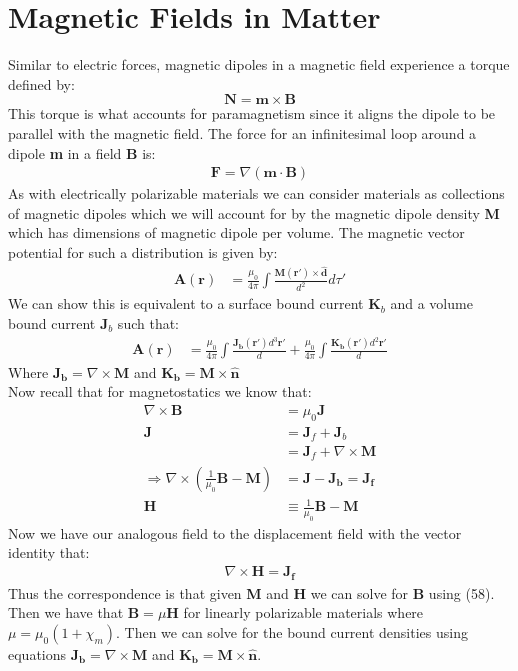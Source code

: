 \documentclass[a4paper, 11pt]{article}
\begin{document}
	\section*{Magnetic Fields in Matter} 
		Similar to electric forces, magnetic dipoles in a magnetic field experience a torque defined by: 
			\begin{equation}
				\mathbf{N} = \mathbf{m} \times \mathbf{B} 
			\end{equation}
		This torque is what accounts for paramagnetism since it aligns the dipole to be parallel with the magnetic field. The force for an infinitesimal loop around a dipole \textbf{m} in a field \textbf{B} is: 
			\begin{align}
				\mathbf{F} = \nabla (\mathbf{m} \cdot \mathbf{B}) 
			\end{align}
		As with electrically polarizable materials we can consider materials as collections of magnetic dipoles which we will account for by the magnetic dipole density \textbf{M} which has dimensions of magnetic dipole per volume. The magnetic vector potential for such a distribution is given by: 
			\begin{align}
				\mathbf{A(r)} &= \frac{\mu_0}{4\pi}\int \frac{\mathbf{M(r')}\times \hat{\mathbf{d}}}{d^2} d\tau' 
			\end{align}
		We can show this is equivalent to a surface bound current $\mathbf{K}_b$ and a volume bound current $\mathbf{J}_b$ such that: 
			\begin{align}
				\mathbf{A(r)} &= \frac{\mu_0}{4\pi}\int \frac{\mathbf{J_b(r')}d^3\mathbf{r'}}{d} + \frac{\mu_0}{4\pi}\int \frac{\mathbf{K_b(r')}d^2\mathbf{r'}}{d}
			\end{align}
		Where $\mathbf{J_b} = \nabla \times \mathbf{M}$ and $\mathbf{K_b} = \mathbf{M} \times \hat{\mathbf{n}}$ \\ 
		
		\noindent Now recall that for magnetostatics we know that: 
			\begin{align}
				\nabla \times \mathbf{B} &= \mu_0\mathbf{J} \\ 
				\mathbf{J} &= \mathbf{J}_f + \mathbf{J}_b \\ 
						&= \mathbf{J}_f + \nabla \times \mathbf{M} \\ 
				\Rightarrow \nabla \times (\frac{1}{\mu_0}\mathbf{B} - \mathbf{M}) &= \mathbf{J} - \mathbf{J_b} = \mathbf{J_f} \\ 
				\mathbf{H} &\equiv \frac{1}{\mu_0}\mathbf{B} - \mathbf{M} 
			\end{align}
		Now we have our analogous field to the displacement field with the vector identity that: 
			\begin{eqnarray}
				\nabla \times \mathbf{H} = \mathbf{J_f} 
			\end{eqnarray}
		Thus the correspondence is that given \textbf{M} and \textbf{H} we can solve for \textbf{B} using (58). Then we have that $\mathbf{B} = \mu \mathbf{H}$ for linearly polarizable materials where $\mu = \mu_0(1+\chi_m)$. Then we can solve for the bound current densities using equations $\mathbf{J_b} = \nabla \times \mathbf{M}$ and $\mathbf{K_b} = \mathbf{M} \times \hat{\mathbf{n}}$. 
\end{document}
